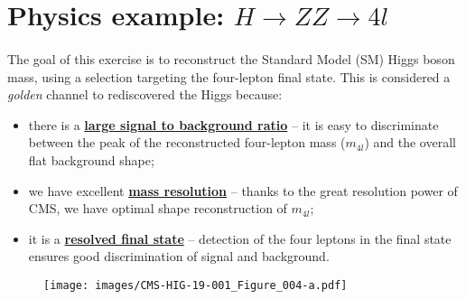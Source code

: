 \section{Physics example: $H \rightarrow ZZ \rightarrow 4l$}
\justifying
\paragraph{}
The goal of this exercise is to reconstruct the Standard Model (SM) Higgs boson mass, using a selection targeting the four-lepton final state. This is considered a \textit{golden} channel to rediscovered the Higgs because:
\begin{itemize}
	\item there is a \textbf{\underline{ large signal to background ratio}} -- it is easy to discriminate between the peak of the reconstructed four-lepton mass ($m_{4l}$) and the overall flat background shape; 
	\item we have excellent \textbf{\underline{ mass resolution}} -- thanks to the great resolution power of CMS, we have optimal shape reconstruction of $m_{4l}$;
	\item it is a \textbf{\underline{ resolved final state}} -- detection of the four leptons in the final state ensures good discrimination of signal and background.
\end{itemize}

\begin{figure}[t]
	\centering
	\texttt{[image: images/CMS-HIG-19-001\_Figure\_004-a.pdf]}
	\label{higgs_plot}
\end{figure}